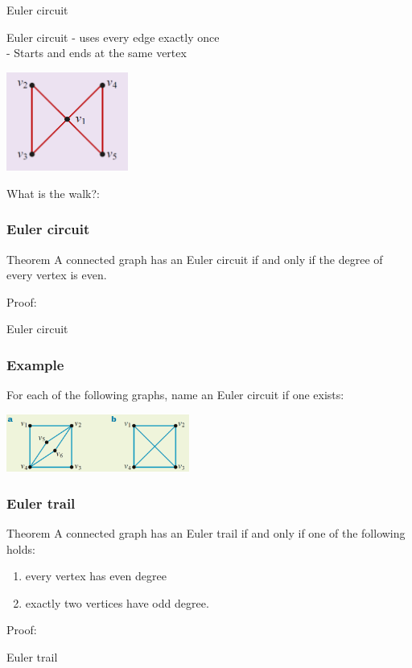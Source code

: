 \documentclass[
	11pt, %
]{beamer}
\begin{document}
\begin{frame}{Euler circuit}
    \begin{block}{Euler circuit}
        - uses every edge exactly once\\
        - Starts and ends at the same vertex\\
        \begin{center}
            \includegraphics[width = 4cm]{E_circuit.png}
        \end{center}
        What is the walk?:
    \end{block}
\end{frame}

\begin{frame}[t]
    \frametitle{Euler circuit}
    \begin{block}{Theorem}
        A connected graph has an Euler circuit if and only if the degree of every vertex is even.
    \end{block}
    Proof:
\end{frame}
\begin{frame}{Euler circuit}
\end{frame}

\begin{frame}[t]
    \frametitle{Example}
    For each of the following graphs, name an Euler circuit if one exists:
    \begin{center}
        \includegraphics[width = 6cm]{Graph10.png}
    \end{center}
\end{frame}

\begin{frame}[t]
    \frametitle{Euler trail}
    \begin{block}{Theorem}
        A connected graph has an Euler trail if and only if one of the following holds:\\
        \begin{enumerate}
            \item every vertex has even degree
            \item exactly two vertices have odd degree.
        \end{enumerate}
    \end{block}
    Proof:
\end{frame}
\begin{frame}{Euler trail}
\end{frame}
\end{document}
